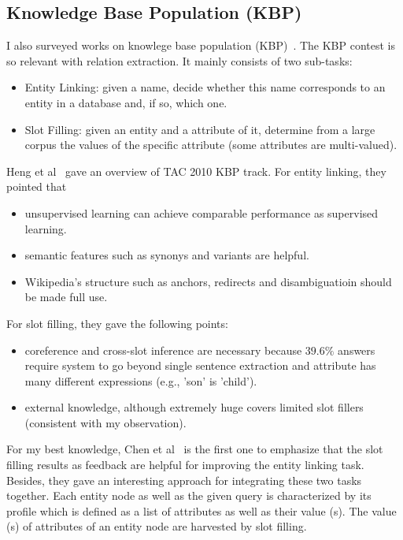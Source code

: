\documentclass[10pt]{article} %
\theoremstyle{definition}
\theoremstyle{definition}
\begin{document}
\subsection{Knowledge Base Population (KBP)}
I also surveyed works on knowlege base population (KBP)~\cite{overviewkbp10, kbp12nyu, cunvkbp10}. 
The KBP contest is so relevant with relation extraction. 
It mainly consists of two sub-tasks:
\begin{itemize}
\item Entity Linking: given a name, decide whether this name corresponds to an entity in a database and, if so, which one. 
\item Slot Filling: given an entity and a attribute of it, determine from a large corpus the values of the specific attribute (some attributes are multi-valued). 
\end{itemize}
Heng et al~\cite{overviewkbp10} gave an overview of TAC 2010 KBP track. 
For entity linking, they pointed that 
\begin{itemize}
\item unsupervised learning can achieve comparable performance as supervised learning. 
\item semantic features such as synonys and variants are helpful. 
\item Wikipedia's structure such as anchors, redirects and disambiguatioin should be made full use. 
\end{itemize}
For slot filling, they gave the following points:
\begin{itemize}
\item coreference and cross-slot inference are necessary because $39.6\%$ answers require system to go beyond single sentence extraction and attribute has many different expressions (e.g., 'son' is 'child'). 
\item external knowledge, although extremely huge covers limited slot fillers (consistent with my observation). 
\end{itemize}
For my best knowledge, Chen et al~\cite{cunykbp10} is the first one to emphasize that 
the slot filling results as feedback are helpful for improving the entity linking task. 
Besides, they gave an interesting approach for integrating these two tasks together. 
Each entity node as well as the given query is characterized by its profile which is defined as 
a list of attributes as well as their value (s).
The value (s) of attributes of an entity node are harvested by slot filling. 
\end{document}
